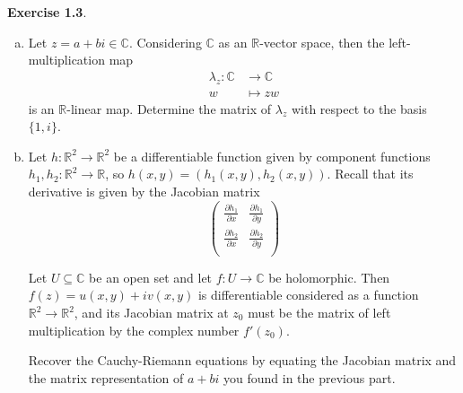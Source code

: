 \documentclass[12pt]{amsart}
\newenvironment{exolab}[1]
{\noindent\textbf{Exercise #1}.}
{\vskip 6pt}
\theoremstyle{remark}
\newcommand{\C}{\mathbb C}
\newcommand{\R}{\mathbb R}
\begin{document}
\begin{exolab}{1.3}
  \begin{enumerate}[(a)]
    \item 
      Let $z = a + bi \in \C$. Considering $\C$ as an $\R$-vector space, then the left-multiplication map
      \begin{align*}
        \lambda_z: \C &\to \C\\
        w &\mapsto zw
      \end{align*}
      is an $\R$-linear map. Determine the matrix of $\lambda_z$ with respect to the basis $\{1, i\}$.

    \item
      Let $h: \R^2 \to \R^2$ be a differentiable function given by component functions $h_1, h_2: \R^2 \to \R$, so $h(x,y) = (h_1(x,y), h_2(x,y))$. Recall that its derivative is given by the Jacobian matrix
      \begin{equation*}
        \begin{pmatrix}
          \frac{\partial h_1}{\partial x} & \frac{\partial h_1}{\partial y}\\[0.5em]
          \frac{\partial h_2}{\partial x} & \frac{\partial h_2}{\partial y}\\
        \end{pmatrix}
      \end{equation*}

      Let $U \subseteq \C$ be an open set and let $f: U \to \C$ be holomorphic. Then $f(z) = u(x,y) + iv(x,y)$ is differentiable considered as a function $\R^2 \to \R^2$, and its Jacobian matrix at $z_0$ must be the matrix of left multiplication by the complex number $f'(z_0)$.

      Recover the Cauchy-Riemann equations by equating the Jacobian matrix  and the matrix representation of $a+bi$ you found in the previous part.
  \end{enumerate}
\end{exolab}
\end{document}

